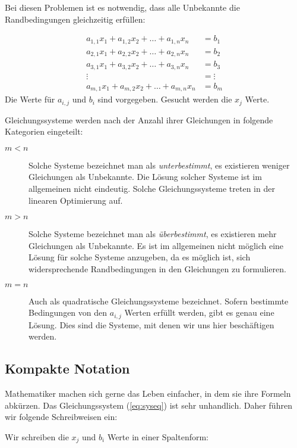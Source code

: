 Bei diesen Problemen ist es notwendig, dass alle Unbekannte die Randbedingungen gleichzeitig erfüllen:

\begin{equation}\label{eq:syseq}
\begin{split}
a_{1,1}x_1 + a_{1,2}x_2 + \dots + a_{1,n}x_n &= b_1 \\
a_{2,1}x_1 + a_{2,2}x_2 + \dots + a_{2,n}x_n &= b_2 \\
a_{3,1}x_1 + a_{3,2}x_2 + \dots + a_{3,n}x_n &= b_3 \\
\vdots &= \vdots \\
a_{m,1}x_1 + a_{m,2}x_2 + \dots + a_{m,n}x_n &= b_m 
\end{split}
\end{equation}
Die Werte für $a_{i,j}$ und $b_{i}$ sind vorgegeben. Gesucht werden die $x_j$ Werte. 

Gleichungssysteme werden nach der Anzahl ihrer Gleichungen in folgende Kategorien eingeteilt:

\begin{description}
\item[$m<n$] Solche Systeme bezeichnet man als \textsl{unterbestimmt}, es existieren weniger Gleichungen als Unbekannte. Die Lösung solcher Systeme ist im allgemeinen nicht eindeutig. Solche Gleichungssysteme treten in der linearen Optimierung auf. 
\item[$m>n$] Solche Systeme bezeichnet man als \textsl{überbestimmt}, es existieren mehr Gleichungen als Unbekannte. Es ist im allgemeinen nicht möglich eine Lösung für solche Systeme anzugeben, da es möglich ist, sich widersprechende Randbedingungen in den Gleichungen zu formulieren. 
\item[$m=n$] Auch als quadratische Gleichungssysteme bezeichnet. Sofern bestimmte Bedingungen von den $a_{i,j}$ Werten erfüllt werden, gibt es genau eine Lösung. Dies sind die Systeme, mit denen wir uns hier beschäftigen werden.
\end{description}

\subsection{Kompakte Notation}

Mathematiker machen sich gerne das Leben einfacher, in dem sie ihre Formeln abkürzen. Das Gleichungssystem (\ref{eq:syseq}) ist sehr unhandlich. Daher führen wir folgende Schreibweisen ein:

Wir schreiben die $x_j$ und $b_i$ Werte in einer Spaltenform: 

